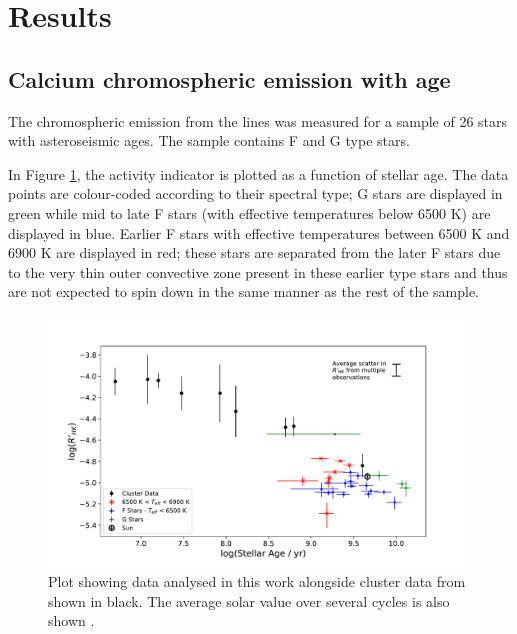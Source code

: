 \section{Results}
\label{Chp4_results}

\subsection{Calcium chromospheric emission with age}
\label{Chp4_results_general_results}
The chromospheric emission from the \caII lines was measured for a sample of 26 stars with asteroseismic ages. The sample contains F and G type stars.

In Figure \ref{fig:calcium_emission_plot}, the \Rprime activity indicator is plotted as a function of stellar age. The data points are colour-coded according to their spectral type; G stars are displayed in green while mid to late F stars (with effective temperatures below 6500 K) are displayed in blue. Earlier F stars with effective temperatures between 6500 K and 6900 K are displayed in red; these stars are separated from the later F stars due to the very thin outer convective zone present in these earlier type stars and thus are not expected to spin down in the same manner as the rest of the sample.

\begin{figure}[h]
	\includegraphics[width=0.99\textwidth]{Figures/4-Chromospheric_age/ca_results_with_clusters.pdf}
	\caption[Calcium emission as a function of age for sample and cluster data]{Plot showing data analysed in this work alongside cluster data from \citet{Mamajek_Hillenbrand_2008} shown in black. The average solar value over several cycles is also shown \citep{Egeland_etal_2017}.}
	\centering
	\label{fig:calcium_emission_plot}
\end{figure}

